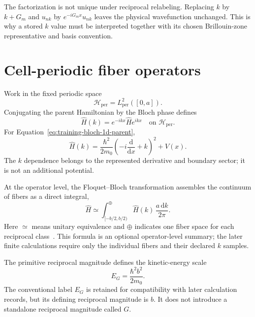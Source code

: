 The factorization is not unique under reciprocal relabeling. Replacing $k$ by
$k+G_m$ and $u_{nk}$ by $e^{-iG_mx}u_{nk}$ leaves the physical wavefunction
unchanged. This is why a stored $k$ value must be interpreted together with its
chosen Brillouin-zone representative and basis convention.

\section{Cell-periodic fiber operators}

Work in the fixed periodic space
\begin{equation}
  \mathcal H_{\mathrm{per}}=L^2_{\mathrm{per}}([0,a]).
\end{equation}
Conjugating the parent Hamiltonian by the Bloch phase defines
\begin{equation}
  \widehat H(k)
  =e^{-ikx}\widehat H e^{ikx}
  \quad\text{on }\mathcal H_{\mathrm{per}}.
  \label{eq:training-geometry-fiber-definition}
\end{equation}
For Equation~\eqref{eq:training-bloch-1d-parent},
\begin{equation}
  \widehat H(k)
  =\frac{\hbar^2}{2m_0}
   \left(-i\frac{\mathrm d}{\mathrm d x}+k\right)^2+V(x).
  \label{eq:training-geometry-schrodinger-fiber}
\end{equation}
The $k$ dependence belongs to the represented derivative and boundary sector;
it is not an additional potential.

At the operator level, the Floquet--Bloch transformation assembles the
continuum of fibers as a direct integral,
\begin{equation}
  \widehat H
  \simeq
  \int_{[-b/2,b/2)}^{\oplus}
    \widehat H(k)\,\frac{a\,\mathrm d k}{2\pi}.
  \label{eq:training-geometry-direct-integral}
\end{equation}
Here $\simeq$ means unitary equivalence and $\oplus$ indicates one fiber space
for each reciprocal class~\cite{kuchment2016}. This formula is an optional
operator-level summary; the later finite calculations require only the
individual fibers and their declared $k$ samples.

The primitive reciprocal magnitude defines the kinetic-energy scale
\begin{equation}
  E_G=\frac{\hbar^2b^2}{2m_0}.
  \label{eq:training-geometry-reciprocal-energy}
\end{equation}
The conventional label $E_G$ is retained for compatibility with later
calculation records, but its defining reciprocal magnitude is $b$. It does not
introduce a standalone reciprocal magnitude called $G$.

